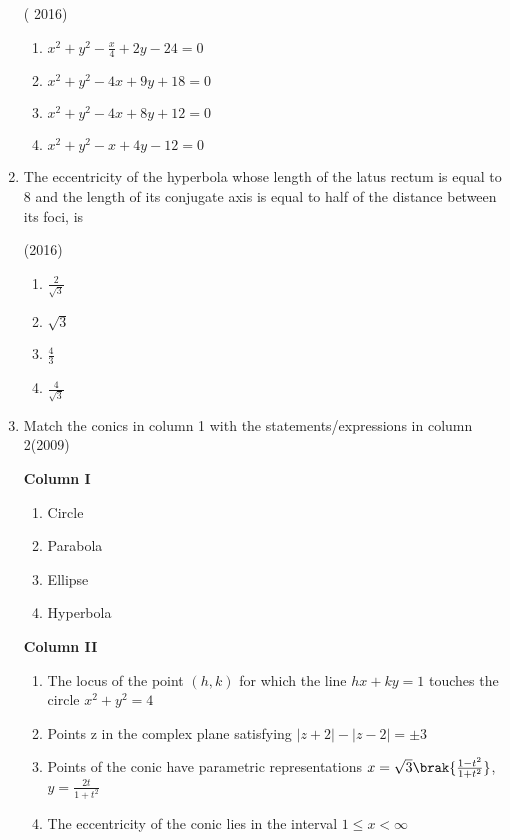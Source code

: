 \begin{enumerate}[label=\thesubsection.\arabic*.,ref=\thesubsection.\theenumi]
\hfill( 2016)
					\begin{multicols}{2}
\begin{enumerate}
    \item $x^2+y^2-\frac{x}{4}+2y-24=0$ 
    \item $x^2+y^2-4x+9y+18=0$ 
    \item $x^2+y^2-4x+8y+12=0$
    \item $x^2+y^2-x+4y-12=0$
\end{enumerate}\end{multicols}
\item The eccentricity of the hyperbola whose length of the latus rectum is equal to $8$ and the length of its conjugate axis is equal to half of the distance between its foci, is 

\hfill(2016)
						\begin{multicols}{2}
\begin{enumerate}
    \item $\frac{2}{\sqrt{3}}$
    \item $\sqrt{3}$
    \item $\frac{4}{3}$
    \item $\frac{4}{\sqrt{3}}$
\end{enumerate}\end{multicols}

\item Match the conics in column 1 with the statements/expressions in column 2\hfill{(2009)}

\begin{multicols}{2}
\textbf{Column I}
\begin{enumerate}
    \item  Circle
    \item  Parabola
    \item  Ellipse 
    \item  Hyperbola  
\end{enumerate} 
\columnbreak
\textbf{Column II}
\begin{enumerate}
	\item The locus of the point ${(h,k)}$ for which the line $hx + ky =1$ touches the circle $x^2 + y^2 = 4$
    \item Points z in the complex plane satisfying $|z + 2|- |z - 2|= \pm 3$
    \item Points of the conic have parametric representations $x=\sqrt{3}
	    \brak{\frac{1 - t^2}{1 + t^2}}$, $ y = \frac{2t}{1 + t^2}$

    \item The eccentricity of the conic lies in the interval $1 \leq x < \infty$


\end{enumerate}
\end{multicols}
\end{enumerate}
